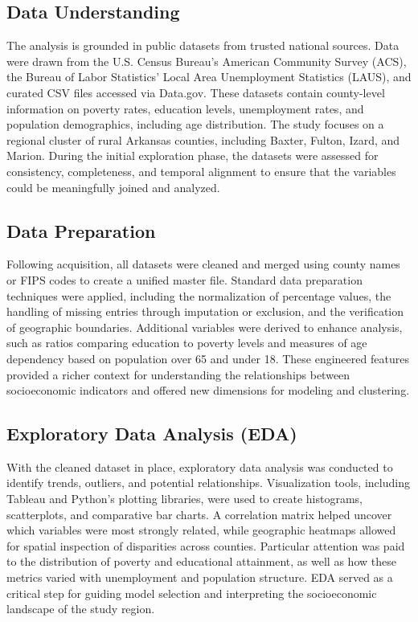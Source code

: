 \documentclass[12pt]{llncs}
\begin{document}
\subsection{Data Understanding}
The analysis is grounded in public datasets from trusted national sources. Data were drawn from the U.S. Census Bureau’s American Community Survey (ACS), the Bureau of Labor Statistics’ Local Area Unemployment Statistics (LAUS), and curated CSV files accessed via Data.gov. These datasets contain county-level information on poverty rates, education levels, unemployment rates, and population demographics, including age distribution. The study focuses on a regional cluster of rural Arkansas counties, including Baxter, Fulton, Izard, and Marion. During the initial exploration phase, the datasets were assessed for consistency, completeness, and temporal alignment to ensure that the variables could be meaningfully joined and analyzed.

\subsection{Data Preparation}
Following acquisition, all datasets were cleaned and merged using county names or FIPS codes to create a unified master file. Standard data preparation techniques were applied, including the normalization of percentage values, the handling of missing entries through imputation or exclusion, and the verification of geographic boundaries. Additional variables were derived to enhance analysis, such as ratios comparing education to poverty levels and measures of age dependency based on population over 65 and under 18. These engineered features provided a richer context for understanding the relationships between socioeconomic indicators and offered new dimensions for modeling and clustering.
\subsection{Exploratory Data Analysis (EDA)}
With the cleaned dataset in place, exploratory data analysis was conducted to identify trends, outliers, and potential relationships. Visualization tools, including Tableau and Python’s plotting libraries, were used to create histograms, scatterplots, and comparative bar charts. A correlation matrix helped uncover which variables were most strongly related, while geographic heatmaps allowed for spatial inspection of disparities across counties. Particular attention was paid to the distribution of poverty and educational attainment, as well as how these metrics varied with unemployment and population structure. EDA served as a critical step for guiding model selection and interpreting the socioeconomic landscape of the study region.
\end{document}
